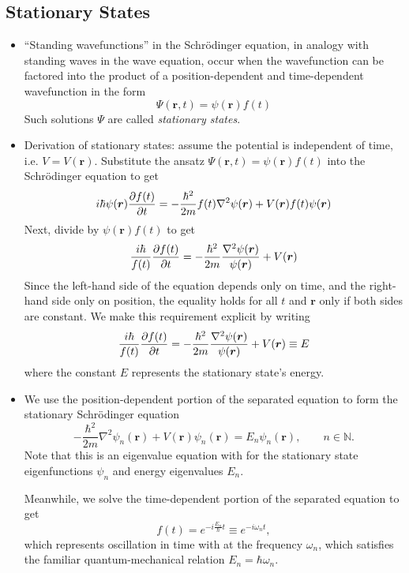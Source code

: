 \documentclass[11pt, a4paper]{article}
\renewcommand{\laplacian}{\nabla^{2}}
\newcommand{\Schro}{Schr\"{o}dinger\xspace}
\renewcommand{\vec}[1]{\bm{#1}}  %
\renewcommand{\r}{\vec{r}}  %
\newcommand{\p}{\psi}  %
\renewcommand{\P}{\Psi}  %
\begin{document}
\subsection{Stationary States}
\begin{itemize}
	\item ``Standing wavefunctions'' in the \Schro equation, in analogy with standing waves in the wave  equation, occur when the wavefunction can be factored into the product of a position-dependent and time-dependent wavefunction in the form
	\begin{equation*}
		\P(\r, t) = \p(\r)f(t)
	\end{equation*}
	Such solutions $ \P $ are called \textit{stationary states}. 
	
	\item Derivation of stationary states: assume the potential is independent of time, i.e. $ V = V(\r) $. Substitute the ansatz $ \P(\r, t) = \p(\r)f(t) $ into the \Schro equation to get
	\begin{equation*}
		i \hbar \p(\r) \pdv{f(t)}{t} = - \frac{\hbar^{2}}{2m} f(t) \laplacian \p(\r) + V(\r)f(t)\p(\r)
	\end{equation*}
	Next, divide by $ \p(\r)f(t) $ to get
	\begin{equation*}
		\frac{i \hbar}{f(t)} \pdv{f(t)}{t} = - \frac{\hbar^{2}}{2m}\frac{\laplacian \p(\r)}{\p(\r)} + V(\r) 
	\end{equation*}
	Since the left-hand side of the equation depends only on time, and the right-hand side only on position, the equality holds for all $ t $ and $ \r $ only if both sides are constant. We make this requirement explicit by writing
	\begin{equation*}
		\frac{i \hbar}{f(t)} \pdv{f(t)}{t} = - \frac{\hbar^{2}}{2m}\frac{\laplacian \p(\r)}{\p(\r)} + V(\r) \equiv E
	\end{equation*}
	where the constant $ E $ represents the stationary state's energy.
	
	\item We use the position-dependent portion of the separated equation to form the stationary \Schro equation
	\begin{equation*}
		-\frac{\hbar^{2}}{2m}\laplacian \p_{n}(\r) + V(\r) \p_{n}(\r) = E_{n}\p_{n}(\r), \qquad n \in \mathbb{N}.
	\end{equation*}
	Note that this is an eigenvalue equation with for the stationary state eigenfunctions $ \p_{n} $ and energy eigenvalues $ E_{n} $.
	
	Meanwhile, we solve the time-dependent portion of the separated equation to get
	\begin{equation*}
		f(t) = e^{-i\frac{E_{n}}{\hbar}t} \equiv e^{-i\omega_{n}t},
	\end{equation*}
	which represents oscillation in time with at the frequency $ \omega_{n} $, which satisfies the familiar quantum-mechanical relation $ E_{n} = \hbar \omega_{n} $. 
	

\end{itemize}
\end{document}

